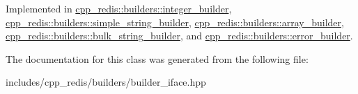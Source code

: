 Implemented in \mbox{\hyperlink{classcpp__redis_1_1builders_1_1integer__builder_a4893dc36d06d75094bb4fe3fbc826966}{cpp\+\_\+redis\+::builders\+::integer\+\_\+builder}}, \mbox{\hyperlink{classcpp__redis_1_1builders_1_1simple__string__builder_ad586164caf02b3022b91789cac23a72d}{cpp\+\_\+redis\+::builders\+::simple\+\_\+string\+\_\+builder}}, \mbox{\hyperlink{classcpp__redis_1_1builders_1_1array__builder_a524f2cb943dde1246dea1b7057e6351e}{cpp\+\_\+redis\+::builders\+::array\+\_\+builder}}, \mbox{\hyperlink{classcpp__redis_1_1builders_1_1bulk__string__builder_a4d80d8dfe305e35aca8b4ec84c56fbea}{cpp\+\_\+redis\+::builders\+::bulk\+\_\+string\+\_\+builder}}, and \mbox{\hyperlink{classcpp__redis_1_1builders_1_1error__builder_af3d67647f012d0a7378684e2f8258a6d}{cpp\+\_\+redis\+::builders\+::error\+\_\+builder}}.



The documentation for this class was generated from the following file\+:\begin{DoxyCompactItemize}
\item 
includes/cpp\+\_\+redis/builders/builder\+\_\+iface.\+hpp\end{DoxyCompactItemize}
